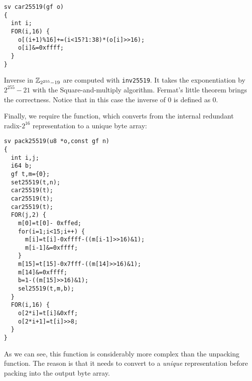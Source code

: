 \begin{lstlisting}[language=Ctweetnacl]
sv car25519(gf o)
{
  int i;
  FOR(i,16) {
    o[(i+1)%16]+=(i<15?1:38)*(o[i]>>16);
    o[i]&=0xffff;
  }
}
\end{lstlisting}

Inverse in $\mathbb{Z}_{2^{255}-19}$ are computed with \texttt{inv25519}.
It takes the exponentiation by $2^{255}-21$ with the Square-and-multiply algorithm.
Fermat's little theorem brings the correctness.
Notice that in this case the inverse of $0$ is defined as $0$.




Finally, we require the  function,
which converts from the internal redundant radix-$2^{16}$
representation to a unique byte array:

\begin{lstlisting}[language=Ctweetnacl]
sv pack25519(u8 *o,const gf n)
{
  int i,j;
  i64 b;
  gf t,m={0};
  set25519(t,n);
  car25519(t);
  car25519(t);
  car25519(t);
  FOR(j,2) {
    m[0]=t[0]- 0xffed;
    for(i=1;i<15;i++) {
      m[i]=t[i]-0xffff-((m[i-1]>>16)&1);
      m[i-1]&=0xffff;
    }
    m[15]=t[15]-0x7fff-((m[14]>>16)&1);
    m[14]&=0xffff;
    b=1-((m[15]>>16)&1);
    sel25519(t,m,b);
  }
  FOR(i,16) {
    o[2*i]=t[i]&0xff;
    o[2*i+1]=t[i]>>8;
  }
}
\end{lstlisting}

As we can see, this function is considerably more complex than the
unpacking function. The reason is that it needs to convert 
to a \emph{unique} representation before packing into the output
byte array.


